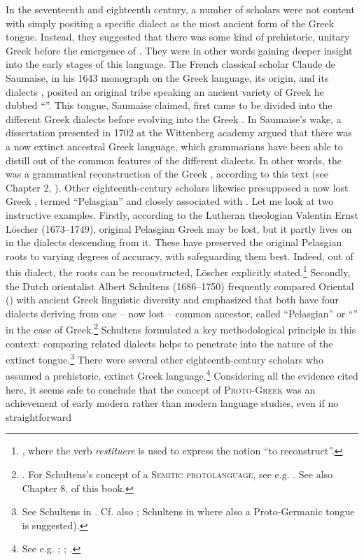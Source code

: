 In the seventeenth and eighteenth century, a number of scholars were not content with simply positing a specific dialect as the most ancient form of the Greek tongue. Instead, they suggested that there was some kind of prehistoric, unitary Greek before the emergence of . They were in other words gaining deeper insight into the early stages of this language. The French classical scholar Claude de Saumaise, in his 1643 monograph on the Greek language, its origin, and its dialects \citep{Saumaise1643a}, posited an original  tribe speaking an ancient variety of Greek he dubbed “”. This tongue, Saumaise claimed, first came to be divided into the different Greek dialects before evolving into the Greek . In Saumaise’s wake, a dissertation presented in 1702 at the Wittenberg academy argued that there was a now extinct ancestral Greek language, which grammarians have been able to distill out of the common features of the different dialects. In other words, the  was a grammatical reconstruction of the Greek , according to this text (see Chapter 2, ). Other eighteenth-century scholars likewise presupposed a now lost Greek , termed “Pelasgian” and closely associated with . Let me look at two instructive examples. Firstly, according to the Lutheran theologian Valentin Ernst Löscher (1673–1749), original Pelasgian Greek may be lost, but it partly lives on in the dialects descending from it. These have preserved the original Pelasgian roots to varying degrees of accuracy, with  safeguarding them best. Indeed, out of this dialect, the roots can be reconstructed, Löscher explicitly stated.\footnote{\citet[24–25, 84–85]{Loscher1705}, where the  verb \textit{restituere} is used to express the notion “to reconstruct”.} Secondly, the Dutch orientalist Albert Schultens (1686–1750) frequently compared Oriental () with ancient Greek linguistic diversity and emphasized that both have four dialects deriving from one – now lost – common ancestor, called “Pelasgian” or “” in the case of Greek.\footnote{\citet[\textsc{lxxv–lxxvi,} \textsc{xcii–xciv,} \textsc{civ}]{Schultens1748}. For Schultens’s concept of a \textsc{Semitic} \textsc{protolanguage}, see e.g. \citet[esp. 84--86]{Eskhult2015}. See also Chapter 8,  of this book.} Schultens formulated a key methodological principle in this context: comparing related dialects helps to penetrate into the nature of the extinct tongue.\footnote{See Schultens in \citet[§§\textsc{cxv–cxx}]{Eskhult_albert_nodate}. Cf. also \citet[19--20]{Schultens1738a}; Schultens in \citet[§§\textsc{xc–xcii}]{Eskhult_albert_nodate} where also a Proto-Germanic tongue is suggested).} There were several other eighteenth-century scholars who assumed a prehistoric, extinct Greek language.\footnote{See e.g. \citet[1--2]{Munthe1748}; \citet[104--106]{Hemsterhuis2015}; \citet[15]{Wise1758}.} Considering all the evidence cited here, it seems safe to conclude that the concept of \textsc{Proto-Greek} was an achievement of early modern rather than modern language studies, even if no straightforward 